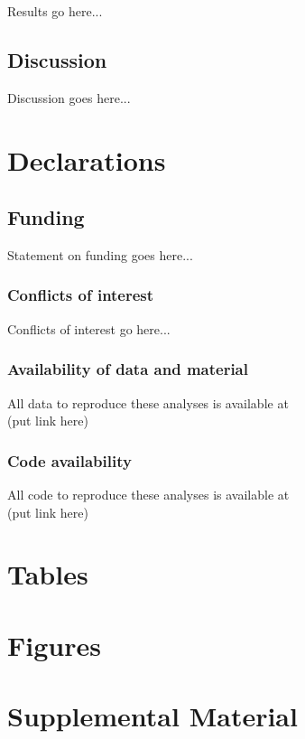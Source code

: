 \documentclass[12pt]{article}
\begin{document}
Results go here...

\subsection*{Discussion}

Discussion goes here...








\clearpage

\section*{Declarations}

\subsection*{Funding}
Statement on funding goes here...

\subsubsection*{Conflicts of interest}
Conflicts of interest go here...

\subsubsection*{Availability of data and material}
All data to reproduce these analyses is available at \\
(put link here)

\subsubsection*{Code availability}
All code to reproduce these analyses is available at \\
(put link here)



\clearpage



\clearpage


\section*{Tables}

\clearpage

\section*{Figures}






\clearpage
\newcommand{\beginsupplement}{%
        \setcounter{page}{1}
        \setcounter{table}{0}
        \renewcommand{\thetable}{S\arabic{table}}%
        \setcounter{figure}{0}
        \renewcommand{\thefigure}{S\arabic{figure}}%
        }

\section*{Supplemental Material}

\beginsupplement
\end{document}
